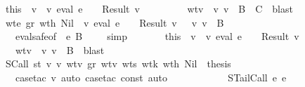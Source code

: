 \begin{isabellebody}
\ \ \ \ \ \ \isamarkupfalse \ this\ \isamarkupfalse \ v{}\ \ v{}{\isacharcolon}\ {\isachardoublequoteopen}eval\ e{}\ {\isasymrho}\ {\isasymmu}\ {\isacharequal}\ Result\ v{}{\isachardoublequoteclose}\isanewline
\ \ \ \ \ \ \ \ \ wtv{}{\isacharcolon}\ {\isachardoublequoteopen}{\isasymSigma}\ {\isasymturnstile}v\ v{}\ {\isacharcolon}\ {\isacharparenleft}B\ {\isasymrightarrow}\ C{\isacharparenright}{\isachardoublequoteclose}\ \isamarkupfalse \ blast\isanewline
\ \ \ \ \ \ \isamarkupfalse \ wte{}\ gr\ wt{\isacharunderscore}h\ Nil\ \isamarkupfalse \ {\isachardoublequoteopen}{\isacharparenleft}{\isasymexists}v{}{\isachardot}\ eval\ e{}\ {\isasymrho}\ {\isasymmu}\ {\isacharequal}\ Result\ v{}\ {\isasymand}\ {\isasymSigma}\ {\isasymturnstile}v\ v{}\ {\isacharcolon}\ B{\isacharparenright}{\isachardoublequoteclose}\isanewline
\ \ \ \ \ \ \ \ \isamarkupfalse \ eval{\isacharunderscore}safe{\isacharbrackleft}of\ {\isasymGamma}\ e{}\ {\isachardoublequoteopen}B{\isachardoublequoteclose}\ {\isasymSigma}\ {\isasymrho}\ {\isasymmu}{\isacharbrackright}\ \isamarkupfalse \ simp\isanewline
\ \ \ \ \ \ \isamarkupfalse \ this\ \isamarkupfalse \ v{}\ \ v{}{\isacharcolon}\ {\isachardoublequoteopen}eval\ e{}\ {\isasymrho}\ {\isasymmu}\ {\isacharequal}\ Result\ v{}{\isachardoublequoteclose}\isanewline
\ \ \ \ \ \ \ \ \ wtv{}{\isacharcolon}\ {\isachardoublequoteopen}{\isasymSigma}\ {\isasymturnstile}v\ v{}\ {\isacharcolon}\ B{\isachardoublequoteclose}\ \isamarkupfalse \ blast\isanewline
\ \ \ \ \ \ \isamarkupfalse \ SCall\ st\ v{}\ v{}\ wtv{}\ gr\ wtv{}\ wts{}\ wt{\isacharunderscore}k\ wt{\isacharunderscore}h\ Nil\ \isamarkupfalse \ {\isacharquery}thesis\isanewline
\ \ \ \ \ \ \ \ \isamarkupfalse \ {\isacharparenleft}case{\isacharunderscore}tac\ v{}{\isacharcomma}\ auto{\isacharcomma}\ case{\isacharunderscore}tac\ {\isachardoublequoteopen}const{\isachardoublequoteclose}{\isacharcomma}\ auto{\isacharparenright}\isanewline
\ \ \ \ \isamarkupfalse \isanewline
\ \ \ \ \ \ \isamarkupfalse \ {\isacharparenleft}STailCall\ e{}\ e{}{\isacharparenright}\isanewline

\end{isabellebody}
